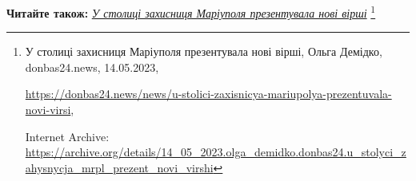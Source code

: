  
 
 
 
 

\textbf{Читайте також:} \href{https://archive.org/details/14_05_2023.olga_demidko.donbas24.u_stolyci_zahysnycja_mrpl_prezent_novi_virshi}{\emph{У столиці захисниця Маріуполя презентувала нові вірші}}%
\footnote{У столиці захисниця Маріуполя презентувала нові вірші, Ольга Демідко, donbas24.news, 14.05.2023, \par%
\url{https://donbas24.news/news/u-stolici-zaxisnicya-mariupolya-prezentuvala-novi-virsi}, \par%
Internet Archive: \url{https://archive.org/details/14_05_2023.olga_demidko.donbas24.u_stolyci_zahysnycja_mrpl_prezent_novi_virshi}%
}
